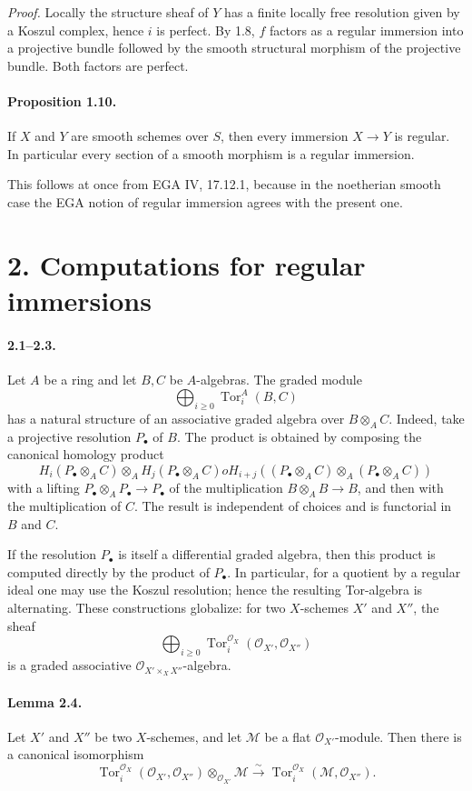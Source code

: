 \documentclass[12pt]{article}
\newcommand{\cO}{\mathcal O}
\newcommand{\cM}{\mathcal M}
\newcommand{\Tor}{\operatorname{Tor}}
\newcommand{\iso}{\xrightarrow{\sim}}
\begin{document}
\emph{Proof.} Locally the structure sheaf of $Y$ has a finite locally free resolution given by a Koszul complex, hence $i$ is perfect. By 1.8, $f$ factors as a regular immersion into a projective bundle followed by the smooth structural morphism of the projective bundle. Both factors are perfect.

\paragraph{Proposition 1.10.} If $X$ and $Y$ are smooth schemes over $S$, then every immersion $X\to Y$ is regular. In particular every section of a smooth morphism is a regular immersion.

This follows at once from EGA IV, 17.12.1, because in the noetherian smooth case the EGA notion of regular immersion agrees with the present one.

\section*{2. Computations for regular immersions}

\paragraph{2.1--2.3.} Let $A$ be a ring and let $B,C$ be $A$-algebras. The graded module
\[
\bigoplus_{i\geq0}\Tor_i^A(B,C)
\]
has a natural structure of an associative graded algebra over $B\otimes_A C$. Indeed, take a projective resolution $P_\bullet$ of $B$. The product is obtained by composing the canonical homology product
\[
H_i(P_\bullet\otimes_A C)\otimes_AH_j(P_\bullet\otimes_A C)	o H_{i+j}((P_\bullet\otimes_A C)\otimes_A(P_\bullet\otimes_A C))
\]
with a lifting $P_\bullet\otimes_A P_\bullet\to P_\bullet$ of the multiplication $B\otimes_AB\to B$, and then with the multiplication of $C$. The result is independent of choices and is functorial in $B$ and $C$.

If the resolution $P_\bullet$ is itself a differential graded algebra, then this product is computed directly by the product of $P_\bullet$. In particular, for a quotient by a regular ideal one may use the Koszul resolution; hence the resulting Tor-algebra is alternating. These constructions globalize: for two $X$-schemes $X'$ and $X''$, the sheaf
\[
\bigoplus_{i\geq0}\Tor_i^{\cO_X}(\cO_{X'},\cO_{X''})
\]
is a graded associative $\cO_{X'\times_X X''}$-algebra.

\paragraph{Lemma 2.4.} Let $X'$ and $X''$ be two $X$-schemes, and let $\cM$ be a flat $\cO_{X'}$-module. Then there is a canonical isomorphism
\[
\Tor_i^{\cO_X}(\cO_{X'},\cO_{X''})\otimes_{\cO_{X'}}\cM\iso \Tor_i^{\cO_X}(\cM,\cO_{X''}).
\]
\end{document}
